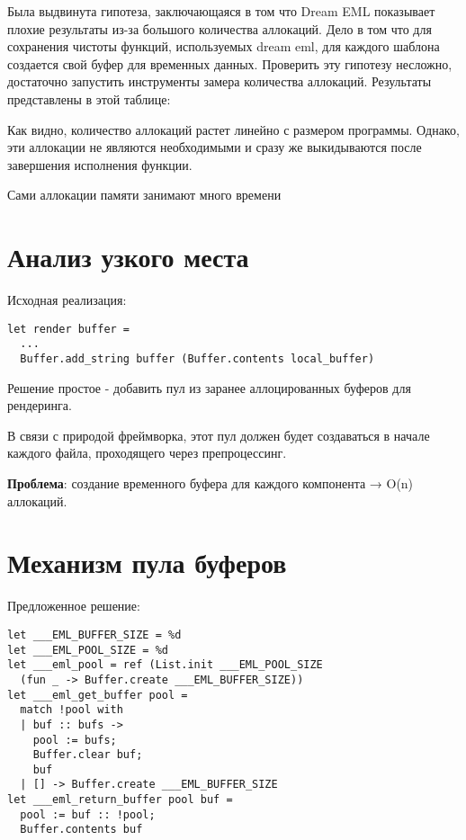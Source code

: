 Была выдвинута гипотеза, заключающаяся в том что Dream EML показывает плохие результаты из-за большого количества аллокаций. %
Дело в том что для сохранения чистоты функций, используемых dream eml, для каждого шаблона создается свой буфер для временных данных.
Проверить эту гипотезу несложно, достаточно запустить инструменты замера количества аллокаций. Результаты представлены в этой таблице:


Как видно, количество аллокаций растет линейно с размером программы. Однако, эти аллокации не являются необходимыми и сразу же выкидываются после завершения исполнения функции.

Сами аллокации памяти занимают много времени %


\section{Анализ узкого места}
Исходная реализация:
\begin{lstlisting}
let render buffer = 
  ...
  Buffer.add_string buffer (Buffer.contents local_buffer)
\end{lstlisting}


Решение простое - добавить пул из заранее аллоцированных буферов для рендеринга.

В связи с природой фреймворка, этот пул должен будет создаваться в начале каждого файла, проходящего через препроцессинг.

\textbf{Проблема}: создание временного буфера для каждого компонента → O(n) аллокаций.
\section{Механизм пула буферов}
Предложенное решение:
\begin{lstlisting}
let ___EML_BUFFER_SIZE = %d
let ___EML_POOL_SIZE = %d
let ___eml_pool = ref (List.init ___EML_POOL_SIZE 
  (fun _ -> Buffer.create ___EML_BUFFER_SIZE))
let ___eml_get_buffer pool =
  match !pool with
  | buf :: bufs ->
    pool := bufs;
    Buffer.clear buf;
    buf
  | [] -> Buffer.create ___EML_BUFFER_SIZE
let ___eml_return_buffer pool buf =
  pool := buf :: !pool;
  Buffer.contents buf

\end{lstlisting}



